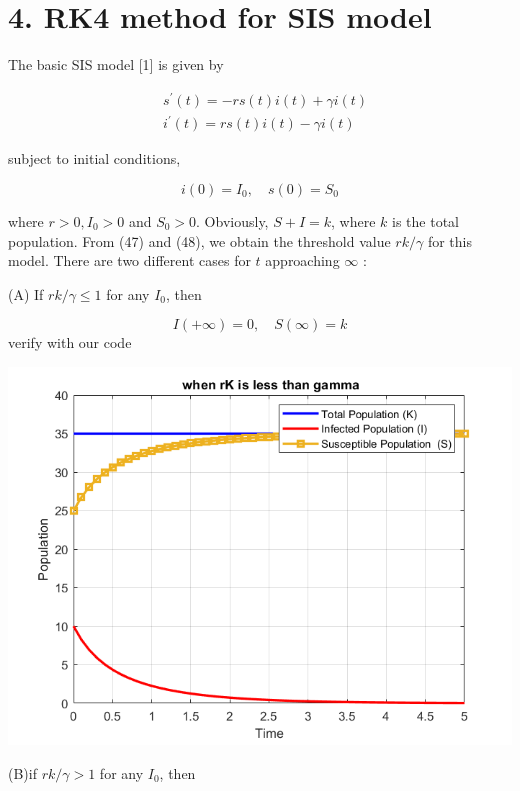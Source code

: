 \documentclass[10pt]{article}
\begin{document}
\section*{4. RK4 method for  SIS model}
The basic SIS model [1] is given by







\begin{align*}
& s^{\prime}(t)=-r s(t) i(t)+\gamma i(t)  \tag{47}\\
& i^{\prime}(t)=r s(t) i(t)-\gamma i(t) \tag{48}
\end{align*}


subject to initial conditions,


\begin{equation*}
i(0)=I_{0}, \quad s(0)=S_{0} \tag{49}
\end{equation*}


where $r>0, I_{0}>0$ and $S_{0}>0$. Obviously, $S+I=k$, where $k$ is the total population. From (47) and (48), we obtain the threshold value $r k / \gamma$ for this model. There are two different cases for $t$ approaching $\infty$ :

(A) If $r k / \gamma \leqslant 1$ for any $I_{0}$, then




\begin{equation*}
I(+\infty)=0, \quad S(\infty)=k \tag{50}
\end{equation*}
verify with our code
  \begin{center}
\includegraphics[max width=\textwidth]{images/when_rK_is_less_than_gamma.png}
\end{center}
\newpage
(B)if $r k / \gamma>1$ for any $I_{0}$, then
\end{document}
